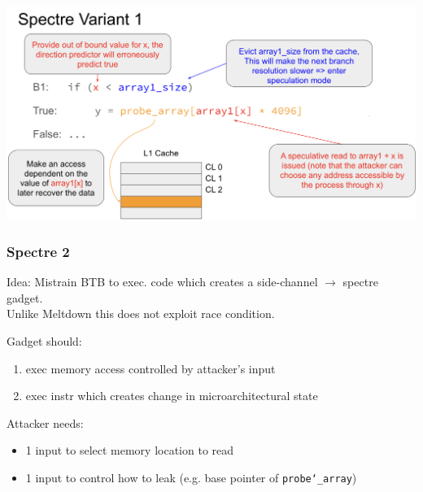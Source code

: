 \begin{center}
    \includegraphics[width=\linewidth]{images/spectre1-overview.png}
\end{center}

\subsubsection{Spectre 2}
Idea: Mistrain BTB to exec. code which creates a side-channel $\xrightarrow{}$
spectre gadget.\\
Unlike Meltdown this does not exploit race condition.

Gadget should:\vspace{-1.5mm}
\begin{enumerate}
    \item exec memory access controlled by attacker's input
    \item exec instr which creates change in microarchitectural state
\end{enumerate}

Attacker needs:\vspace{-1.5mm}
\begin{itemize}
    \item 1 input to select memory location to read
    \item 1 input to control how to leak (e.g. base pointer of \texttt{probe\char`_array})
\end{itemize}
